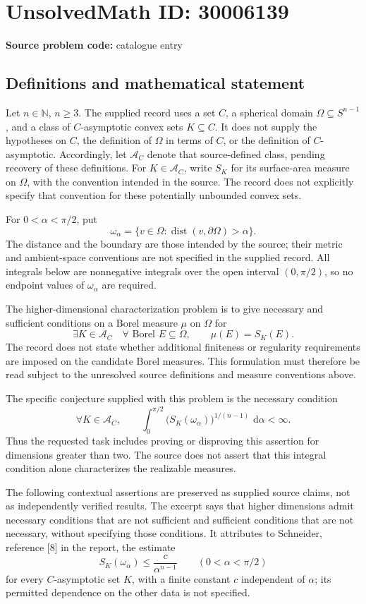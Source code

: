 \documentclass[11pt]{article}
\newcommand{\N}{\mathbb{N}}
\newcommand{\dd}{\,\mathrm{d}}
\begin{document}
\section*{UnsolvedMath ID: 30006139}
\textbf{Source problem code:} catalogue entry
\subsection{Definitions and mathematical statement}
Let \(n\in\N\), \(n\geq 3\). The supplied record uses a set \(C\), a spherical domain \(\Omega\subseteq S^{n-1}\), and a class of \(C\)-asymptotic convex sets \(K\subseteq C\). It does not supply the hypotheses on \(C\), the definition of \(\Omega\) in terms of \(C\), or the definition of \(C\)-asymptotic. Accordingly, let \(\mathcal A_C\) denote that source-defined class, pending recovery of these definitions. For \(K\in\mathcal A_C\), write \(S_K\) for its surface-area measure on \(\Omega\), with the convention intended in the source. The record does not explicitly specify that convention for these potentially unbounded convex sets.

For \(0<\alpha<\pi/2\), put
\[
\omega_\alpha=\{v\in\Omega:\operatorname{dist}(v,\partial\Omega)>\alpha\}.
\]
The distance and the boundary are those intended by the source; their metric and ambient-space conventions are not specified in the supplied record. All integrals below are nonnegative integrals over the open interval \((0,\pi/2)\), so no endpoint values of \(\omega_\alpha\) are required.

The higher-dimensional characterization problem is to give necessary and sufficient conditions on a Borel measure \(\mu\) on \(\Omega\) for
\[
\exists K\in\mathcal A_C\quad
\forall\text{ Borel }E\subseteq\Omega,\qquad \mu(E)=S_K(E).
\]
The record does not state whether additional finiteness or regularity requirements are imposed on the candidate Borel measures. This formulation must therefore be read subject to the unresolved source definitions and measure conventions above.

The specific conjecture supplied with this problem is the necessary condition
\[
\forall K\in\mathcal A_C,\qquad
\int_0^{\pi/2}\bigl(S_K(\omega_\alpha)\bigr)^{1/(n-1)}\,\dd\alpha<\infty.
\]
Thus the requested task includes proving or disproving this assertion for dimensions greater than two. The source does not assert that this integral condition alone characterizes the realizable measures.

The following contextual assertions are preserved as supplied source claims, not as independently verified results. The excerpt says that higher dimensions admit necessary conditions that are not sufficient and sufficient conditions that are not necessary, without specifying those conditions. It attributes to Schneider, reference [8] in the report, the estimate
\[
S_K(\omega_\alpha)\leq \frac{c}{\alpha^{n-1}}
\qquad(0<\alpha<\pi/2)
\]
for every \(C\)-asymptotic set \(K\), with a finite constant \(c\) independent of \(\alpha\); its permitted dependence on the other data is not specified.
\end{document}
